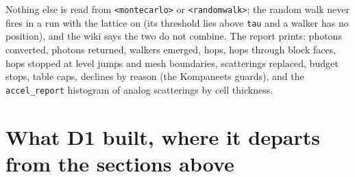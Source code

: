\documentclass[11pt]{article}
\newcommand{\key}[1]{\texttt{#1}}
\begin{document}
Nothing else is read from \texttt{<montecarlo>} or \texttt{<randomwalk>}; the random walk
never fires in a run with the lattice on (its threshold lies above \key{tau} and a
walker has no position), and the wiki says the two do not combine.  The report
prints: photons converted, photons returned, walkers emerged, hops, hops through
block faces, hops stopped at level jumps and mesh boundaries, scatterings replaced,
budget stops, table caps, declines by reason (the Kompaneets guards), and the
\key{accel\_report} histogram of analog scatterings by cell thickness.

\section{What D1 built, where it departs from the sections above}
\label{sec:d1}
\end{document}

